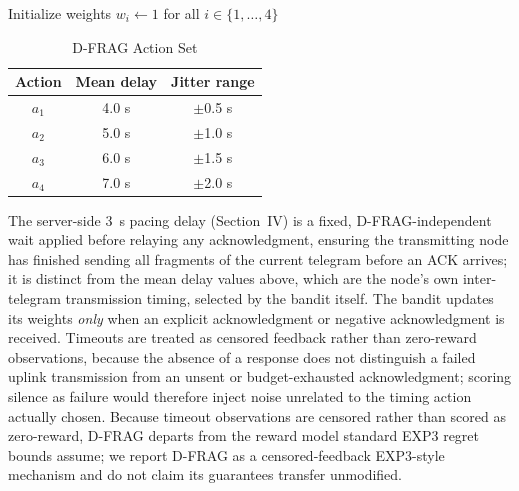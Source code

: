 \documentclass[journal]{IEEEtran}
\begin{document}
\begin{algorithm}[!t]
\caption{D-FRAG: Node-Side EXP3 Timing Selection}
\label{alg:dfrag}
\SetAlgoLined
{}
Initialize weights $w_i \leftarrow 1$ for all $i \in \{1,\ldots,4\}$\;
\end{algorithm}

\begin{table}[t]
\caption{D-FRAG Action Set}
\label{tab:dfrag-actions}
\centering
\begin{tabular}{@{}ccc@{}}
\toprule
Action & Mean delay & Jitter range \\
\midrule
$a_1$ & 4.0 s & $\pm$0.5 s \\
$a_2$ & 5.0 s & $\pm$1.0 s \\
$a_3$ & 6.0 s & $\pm$1.5 s \\
$a_4$ & 7.0 s & $\pm$2.0 s \\
\bottomrule
\end{tabular}
\end{table}

The server-side 3~s pacing delay (Section~IV) is a fixed, D-FRAG-independent wait applied before relaying any acknowledgment, ensuring the transmitting node has finished sending all fragments of the current telegram before an ACK arrives; it is distinct from the mean delay values above, which are the node's own inter-telegram transmission timing, selected by the bandit itself. The bandit updates its weights \emph{only} when an explicit acknowledgment or negative acknowledgment is received. Timeouts are treated as censored feedback rather than zero-reward observations, because the absence of a response does not distinguish a failed uplink transmission from an unsent or budget-exhausted acknowledgment; scoring silence as failure would therefore inject noise unrelated to the timing action actually chosen. Because timeout observations are censored rather than scored as zero-reward, D-FRAG departs from the reward model standard EXP3 regret bounds assume; we report D-FRAG as a censored-feedback EXP3-style mechanism and do not claim its guarantees transfer unmodified.
\end{document}
